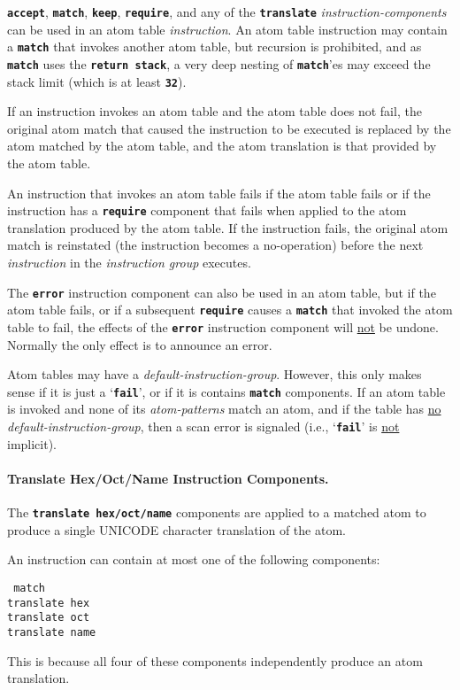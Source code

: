\documentclass[12pt]{article}
\newcommand{\subsubsubsection}[1]{\paragraph[#1]{#1.}}
\newcommand{\TT}[1]{{\tt \bfseries #1}}
\newcommand{\EOL}{\penalty \exhyphenpenalty}
\begin{document}
\TT{accept}, \TT{match}, \TT{keep}, \TT{require}, and
any of the \TT{translate} {\em instruction-components} can be used in
an atom table {\em instruction}.  An atom table
instruction may contain a \TT{match} that invokes another atom table,
but recursion is prohibited, and as \TT{match} uses the
\TT{return stack}, a very deep nesting of \TT{match}'es may
exceed the stack limit (which is at least \TT{32}).

If an instruction invokes an atom table and
the atom table does not fail,
the original atom match that caused the instruction
to be executed is replaced by the atom matched by the
atom table, and the atom translation is that provided by the atom table.

An instruction that invokes an atom table fails if the atom table
fails or if the instruction has a \TT{require} component that fails
when applied to the atom translation produced by the atom table.
If the instruction fails, the
original atom match is reinstated (the instruction becomes a
no-operation) before the next {\em instruction} in the {\em instruction group}
executes.

The \TT{error} instruction component can also be used in an atom
table, but if the atom table fails, or if a subsequent \TT{require}
causes a \TT{match} that invoked the atom table to fail, the
effects of the \TT{error} instruction component will \underline{not}
be undone.  Normally the only effect is to announce an error.

Atom tables may have a {\em default-instruction-group}.
However, this only makes sense if it is just a `\TT{fail}', or
if it is contains \TT{match} components.  If an atom table
is invoked and none of its {\em atom-patterns} match an atom,
and if the table has \underline{no} {\em default-instruction-group},
then a scan error is signaled (i.e., `\TT{fail}' is \underline{not}
implicit).

\subsubsubsection{Translate Hex/Oct/Name Instruction Components}

The \TT{translate hex/\EOL oct/\EOL name} components are applied to a matched
atom to produce a single UNICODE character translation of the atom.

An instruction can contain at most one of the following components:
\begin{center}
\tt
match \\
translate hex \\
translate oct \\
translate name
\end{center}
This is because all four of these components independently produce
an atom translation.
\end{document}
